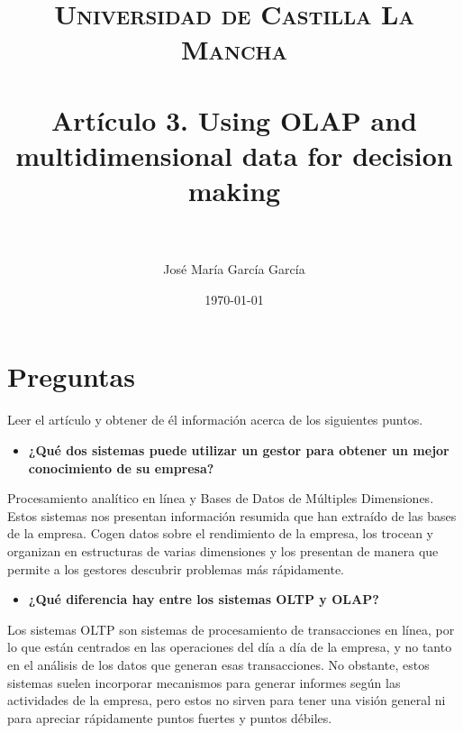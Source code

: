 \documentclass[paper=a4, fontsize=11pt]{scrartcl} %
\title{	
\normalfont \normalsize 
\textsc{Universidad de Castilla La Mancha} \\ [25pt] %
\horrule{0.5pt} \\[0.4cm] %
\huge Artículo 3. Using OLAP and multidimensional data for decision making \\ %
\horrule{2pt} \\[0.5cm] %
}
\author{José María García García} %
\date{\normalsize\today} %
\begin{document}
\maketitle %


\section{Preguntas}

Leer el artículo y obtener de él información acerca de los siguientes puntos.

\begin{itemize}
\item \textbf{ ¿Qué dos sistemas puede utilizar un gestor para obtener un mejor conocimiento de su empresa?}
\end{itemize}
Procesamiento analítico en línea y Bases de Datos de Múltiples Dimensiones. Estos sistemas nos presentan información resumida que han extraído de las bases de la empresa. Cogen datos sobre el rendimiento de la empresa, los trocean y organizan en estructuras de varias dimensiones y los presentan de manera que permite a los gestores descubrir problemas más rápidamente. 

\begin{itemize}
\item \textbf{¿Qué diferencia hay entre los sistemas OLTP y OLAP?}
\end{itemize}
Los sistemas OLTP son sistemas de procesamiento de transacciones en línea, por lo que están centrados en las operaciones del día a día de la empresa, y no tanto en el análisis de los datos que generan esas transacciones. No obstante, estos sistemas suelen incorporar mecanismos para generar informes según las actividades de la empresa, pero estos no sirven para tener una visión general ni para apreciar rápidamente puntos fuertes y puntos débiles. 
\end{document}
